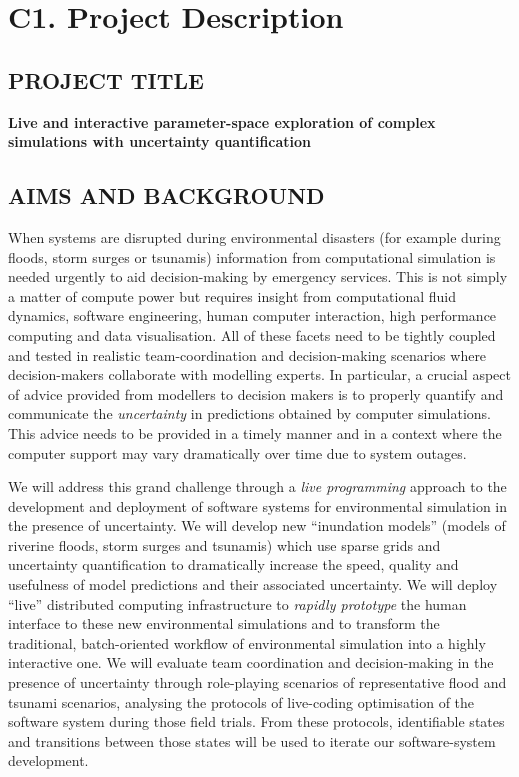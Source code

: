 \documentclass[a4paper,fontsize=12pt]{scrartcl}
\author{}
\date{\today}
\begin{document}
\section*{C1. Project Description}
\label{sec:project-description}

\subsection*{PROJECT TITLE}

\textbf{Live and interactive parameter-space exploration of complex simulations with uncertainty quantification}

\subsection*{AIMS AND BACKGROUND}

When systems are disrupted during environmental disasters (for example
during floods, storm surges or tsunamis) information from
computational simulation is needed urgently to aid decision-making by
emergency services. This is not simply a matter of compute power but
requires insight from computational fluid dynamics, software
engineering, human computer interaction, high performance computing
and data visualisation. All of these facets need to be tightly coupled
and tested in realistic team-coordination and decision-making
scenarios where decision-makers collaborate with modelling experts. In
particular, a crucial aspect of advice provided from modellers to
decision makers is to properly quantify and communicate the
\emph{uncertainty} in predictions obtained by computer simulations.
This advice needs to be provided in a timely manner and in a context
where the computer support may vary dramatically over time due to
system outages.

We will address this grand challenge through a \emph{live programming}
approach to the development and deployment of software systems for
environmental simulation in the presence of uncertainty. We will
develop new ``inundation models'' (models of riverine floods, storm
surges and tsunamis) which use sparse grids and uncertainty
quantification to dramatically increase the speed, quality and
usefulness of model predictions and their associated uncertainty. We
will deploy ``live'' distributed computing infrastructure to
\emph{rapidly prototype} the human interface to these new
environmental simulations and to transform the traditional,
batch-oriented workflow of environmental simulation into a highly
interactive one. We will evaluate team coordination and
decision-making in the presence of uncertainty through role-playing
scenarios of representative flood and tsunami scenarios, analysing the
protocols of live-coding optimisation of the software system during
those field trials. From these protocols, identifiable states and
transitions between those states will be used to iterate our
software-system development.
\end{document}
